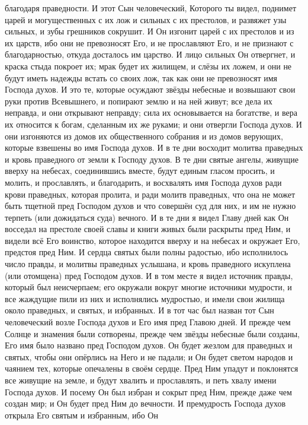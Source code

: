 благодаря праведности.
И этот Сын человеческий, Которого ты видел, поднимет царей и
могущественных с их лож и сильных с их престолов, и развяжет узы сильных, и
зубы грешников сокрушит.
И Он изгонит царей с их престолов и из их царств, ибо они не
превозносят Его, и не прославляют Его, и не признают с благодарностью, откуда
досталось им царство.
И лицо сильных Он отвергнет, и краска стыда покроет их; мрак будет их
жилищем, и слёзы их ложем, и они не будут иметь надежды встать со своих лож,
так как они не превозносят имя Господа духов.
И это те, которые осуждают звёзды небесные и возвышают свои руки
против Всевышнего, и попирают землю и на ней живут; все дела их неправда, и они
открывают неправду; сила их основывается на богатстве, и вера их относится к
богам, сделанным их же руками; и они отвергли Господа духов.
И они изгоняются из домов их общественного собрания и из домов
верующих, которые взвешены во имя Господа духов.
И в те дни восходит молитва праведных и кровь праведного от земли
к Господу духов.
В те дни святые ангелы, живущие вверху на небесах, соединившись
вместе,
будут единым гласом просить, и молить, и прославлять, и благодарить, и
восхвалять имя Господа духов ради крови праведных, которая пролита, и ради
молитв праведных, что она не может быть тщетной пред Господом духов и что
совершён суд для них, и им не нужно терпеть (или дожидаться суда) вечного.
И в те дни я видел Главу дней как Он восседал на престоле своей славы
и книги живых были раскрыты пред Ним, и видели всё Его воинство, которое
находится вверху и на небесах и окружает Его, предстоя пред Ним.
И сердца святых были полны радостью, ибо исполнилось число правды, и
молитвы праведных услышана, и кровь праведного искуплена (или отомщена) пред
Господом духов.
И в том месте я видел источник правды, который был неисчерпаем;
его окружали вокруг многие источники мудрости, и все жаждущие пили из них и
исполнялись мудростью, и имели свои жилища около праведных, и святых, и
избранных.
И в тот час был назван тот Сын человеческий возле Господа духов и Его
имя пред Главою дней.
И прежде чем Солнце и знамения были сотворены, прежде чем звёзды
небесные были созданы, Его имя было названо пред Господом духов.
Он будет жезлом для праведных и святых, чтобы они опёрлись на Него и
не падали; и Он будет светом народов и чаянием тех, которые опечалены в своём
сердце.
Пред Ним упадут и поклонятся все живущие на земле, и будут хвалить и
прославлять, и петь хвалу имени Господа духов.
И посему Он был избран и сокрыт пред Ним, прежде даже чем создан мир;
и Он будет пред Ним до вечности.
И премудрость Господа духов открыла Его святым и избранным, ибо Он
